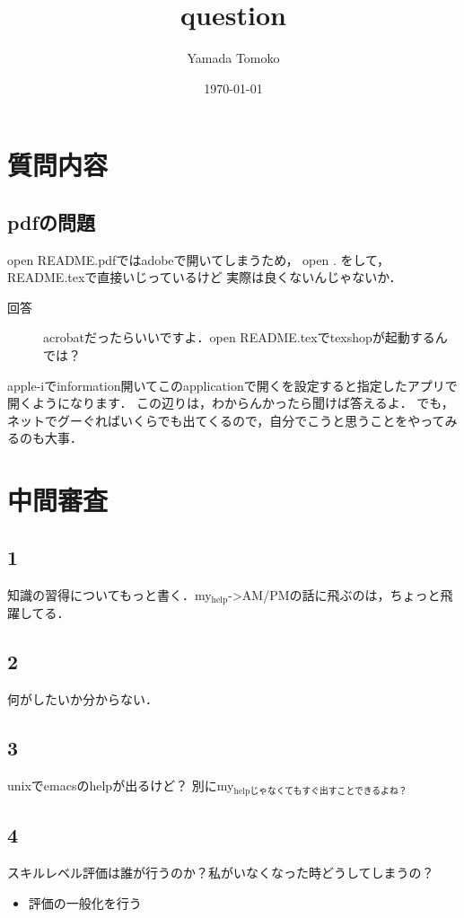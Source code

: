 \documentclass[11pt]{article}
\author{Yamada Tomoko}
\date{\today}
\title{question}
\begin{document}
\maketitle
\tableofcontents


\section{質問内容}
\label{sec-1}

\subsection{pdfの問題}
\label{sec-1-1}
open README.pdfではadobeで開いてしまうため，
open . をして，README.texで直接いじっているけど
実際は良くないんじゃないか．

\begin{description}
\item[{回答}] acrobatだったらいいですよ．open README.texでtexshopが起動するんでは？
\end{description}
apple-iでinformation開いてこのapplicationで開くを設定すると指定したアプリで開くようになります．
この辺りは，わからんかったら聞けば答えるよ．
でも，ネットでグーぐればいくらでも出てくるので，自分でこうと思うことをやってみるのも大事．

\section{中間審査}
\label{sec-2}
\subsection{1}
\label{sec-2-1}
知識の習得についてもっと書く．my$_{\text{help}}$->AM/PMの話に飛ぶのは，ちょっと飛躍してる．
\subsection{2}
\label{sec-2-2}
何がしたいか分からない．

\subsection{3}
\label{sec-2-3}
unixでemacsのhelpが出るけど？
別にmy$_{\text{helpじゃなくてもすぐ出すことできるよね？}}$

\subsection{4}
\label{sec-2-4}
スキルレベル評価は誰が行うのか？私がいなくなった時どうしてしまうの？
\begin{itemize}
\item 評価の一般化を行う
\end{itemize}
\end{document}
